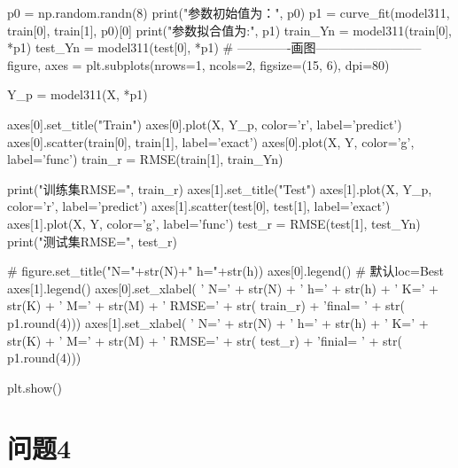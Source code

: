 \begin{python}
p0 = np.random.randn(8)
print("参数初始值为：", p0)
p1 = curve_fit(model311, train[0], train[1], p0)[0]
print("参数拟合值为:", p1)
train_Yn = model311(train[0], *p1)
test_Yn = model311(test[0], *p1)
# -------------画图--------------------------
figure, axes = plt.subplots(nrows=1, ncols=2, figsize=(15, 6), dpi=80)

Y_p = model311(X, *p1)

axes[0].set_title("Train")
axes[0].plot(X, Y_p, color='r', label='predict')
axes[0].scatter(train[0], train[1], label='exact')
axes[0].plot(X, Y, color='g', label='func')
train_r = RMSE(train[1], train_Yn)

print("训练集RMSE=", train_r)
axes[1].set_title("Test")
axes[1].plot(X, Y_p, color='r', label='predict')
axes[1].scatter(test[0], test[1], label='exact')
axes[1].plot(X, Y, color='g', label='func')
test_r = RMSE(test[1], test_Yn)
print("测试集RMSE=", test_r)

# figure.set_title("N="+str(N)+" h="+str(h))
axes[0].legend()  # 默认loc=Best
axes[1].legend()
axes[0].set_xlabel(
    ' N=' + str(N) + ' h=' + str(h) + ' K=' + str(K) + ' M=' + str(M) + ' RMSE=' + str(
        train_r) + '\nparameter final= ' + str(
        p1.round(4)))
axes[1].set_xlabel(
    ' N=' + str(N) + ' h=' + str(h) + ' K=' + str(K) + ' M=' + str(M) + ' RMSE=' + str(
        test_r) + '\nparameter finial= ' + str(
        p1.round(4)))

plt.show()

\end{python}

\section{问题4}

